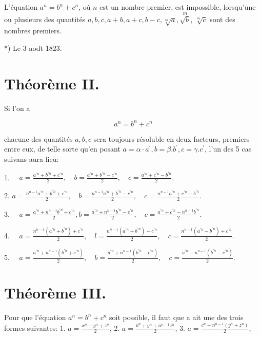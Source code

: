 \documentclass{article}
\begin{document}
L'équation \(a^{n}=b^{n}+c^{n}\), où \(n\) est un nombre premier, est impossible, lorsqu'une ou plusieurs des quantités \(a, b, c, a+b, a+c, b-c, \sqrt[m]{a}, \stackrel{m}{\sqrt{b}}\), \(\sqrt[m]{\bar{c}}\) sont des nombres premiers.

*) Le 3 aodt 1823.

\section*{Théorème II.}

Si l'on a

\[
a^{n}=b^{n}+c^{n}
\]

chacune des quantités \(a, b, c\) sera toujours résoluble en deux facteurs, premiers entre eux, de telle sorte qu'en posant \(a=\alpha \cdot a^{\prime}, b=\beta . b^{\prime}, c=\gamma . c^{\prime}\), l'un des 5 cas suivans aura lieu:

1. \(\quad a=\frac{a^{\prime n}+b^{\prime n}+c^{\prime n}}{2}, \quad b=\frac{a^{\prime n}+b^{\prime n}-c^{\prime n}}{2}, \quad c=\frac{a^{\prime n}+c^{\prime n}-b^{\prime n}}{2}\).

2. \(a=\frac{n^{n-1} a^{\prime n}+b^{\prime n}+c^{\prime n}}{2}, \quad b=\frac{n^{n-1} a^{\prime n}+b^{\prime n}-c^{\prime n}}{2}, \quad c=\frac{n^{n-1} a^{\prime n}+c^{\prime n}-b^{\prime n}}{2}\).

3. \(\quad a=\frac{a^{\prime n}+n^{n-1} b^{\prime n}+c^{\prime n}}{2}, b=\frac{a^{\prime n}+n^{n-1} b^{\prime n}-e^{\prime n}}{2}, \quad c=\frac{a^{\prime n}+c^{\prime n}-n^{n-1} b^{\prime n}}{2}\).

4. \(\quad a=\frac{n^{n-1}\left(a^{\prime n}+b^{\prime n}\right)+c^{\prime n}}{2}, \quad l=\frac{n^{n-1}\left(a^{\prime n}+b^{\prime n}\right)-c^{\prime n}}{2}, \quad c=\frac{n^{n-1}\left(a^{\prime n}-b^{\prime n}\right)+c^{\prime n}}{2}\).

5. \(\quad a=\frac{a^{\prime n}+n^{n-1}\left(b^{\prime n}+c^{\prime n}\right)}{2}, \quad b=\frac{a^{\prime n}+n^{n-1}\left(b^{\prime n}-c^{\prime n}\right)}{2}, \quad c=\frac{a^{\prime n}-n^{n-1}\left(b^{\prime n}-c^{\prime n}\right)}{2}\).

\section*{Théorème III.}

Pour que l'équation \(a^{n}=b^{n}+c^{n}\) soit possible, il faut que a ait une des trois formes suivantes:
1. \(a=\frac{x^{n}+y^{n}+z^{n}}{2}\),
2. \(a=\frac{k^{n}+y^{n}+n^{n-1} z^{n}}{2}\),
3. \(a=\frac{c^{n}+n^{n-1}\left(y^{n}+z^{n}\right)}{2}\),
\end{document}
